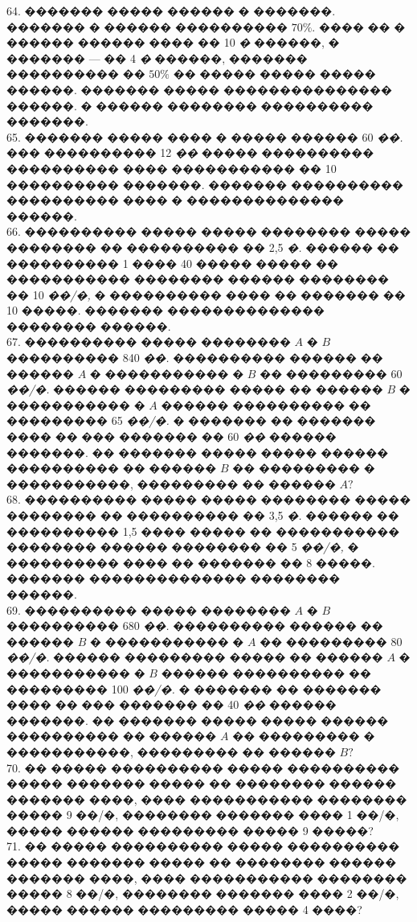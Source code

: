 \documentclass[12pt]{article}
\begin{document}
64. ������� ����� ������ � �������. ������� � ������ ���������� $70\%.$ ���� �� � ������ ������ ���� �� 10 {\it �} ������, � ������� --- �� 4 {\it �} ������, ������� ���������� �� $50\%$ �� ����� ����� ����� ������. ������� ����� ��������������� ������. � ������ �������� ���������� �������.\\
65. ������� ����� ���� � ����� ������ 60 {\it ��.} ��� ���������� 12 {\it ��} ����� ���������� ���������� ���� ����������� �� 10 ���������� �������. ������� ���������� ���������� ���� � �������������� ������.\\
66. ���������� ����� ����� �������� ����� �������� �� ���������� �� 2,5 {\it �.} ������ �� ���������� 1 ���� 40 ����� ����� �� ����������� �������� ������ �������� �� 10 {\it ��/�,} � ���������� ���� �� ������� �� 10 �����. ������� �������������� �������� ������.\\
67. ���������� ����� �������� $A$ � $B$ ���������� 840 {\it ��.} ���������� ������ �� ������ $A$ � ����������� � $B$ �� ��������� 60 {\it ��/�.} ������ ��������� ����� �� ������ $B$ � ����������� � $A$ ������ ���������� �� ��������� 65 {\it ��/�.} � ������� �� ������� ���� �� ��� ������� �� 60 {\it ��} ������ �������. �� ������� ����� ����� ������ ���������� �� ������ $B$ �� ��������� � �����������, ��������� �� ������ $A?$\\
68. ���������� ����� ����� �������� ����� �������� �� ���������� �� 3,5 {\it �.} ������ �� ���������� 1,5 ���� ����� �� ����������� �������� ������ �������� �� 5 {\it ��/�,} � ���������� ���� �� ������� �� 8 �����. ������� �������������� �������� ������.\\
69. ���������� ����� �������� $A$ � $B$ ���������� 680 {\it ��.} ���������� ������ �� ������ $B$ � ����������� � $A$ �� ��������� 80 {\it ��/�.} ������ ��������� ����� �� ������ $A$ � ����������� � $B$ ������ ���������� �� ��������� 100 {\it ��/�.} � ������� �� ������� ���� �� ��� ������� �� 40 {\it ��} ������ �������. �� ������� ����� ����� ������ ���������� �� ������ $A$ �� ��������� � �����������, ��������� �� ������ $B?$\\
70. �� ����� ���������� ����� ���������� ����� ������� ����� �� �������� ������ ������� ����, ���� ����������� �������� ����� 9 ��/�, �������� ������� ���� 1 ��/�, ����� ������ ��������� ����� 9 �����?\\
71. �� ����� ���������� ����� ���������� ����� ������� ����� �� �������� ������ ������� ����, ���� ����������� �������� ����� 8 ��/�, �������� ������� ���� 2 ��/�, ����� ������ ��������� ����� 4 ����?\\
\end{document}
